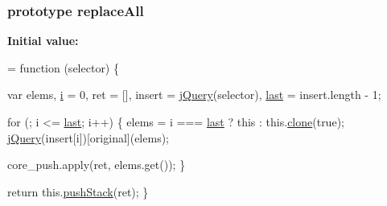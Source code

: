 \subsubsection[{\texorpdfstring{replace\+All}{replaceAll}}]{ {\bf prototype} replace\+All}\hypertarget{jquery-2_82_81-vsdoc_8js_a2e887b3101a3bb067b3acfd8d292ceb0}{}\label{jquery-2_82_81-vsdoc_8js_a2e887b3101a3bb067b3acfd8d292ceb0}
{\bfseries Initial value\+:}
\begin{DoxyCode}
= \textcolor{keyword}{function} (selector) \{
        

        var elems,
            \hyperlink{geolocation-marker_8js_a0325b7ce0988782a8032e720ef3aa411}{i} = 0,
            ret = [],
            insert = \hyperlink{jquery-2_82_81-vsdoc_8js_add5237586d970a38a81f990e8eb28c6c}{jQuery}(selector),
            \hyperlink{jquery-2_82_81-vsdoc_8js_a5a9684d230de11a6ec3029bcce128977}{last} = insert.length - 1;

        \textcolor{keywordflow}{for} (; i <= \hyperlink{jquery-2_82_81-vsdoc_8js_a5a9684d230de11a6ec3029bcce128977}{last}; i++) \{
            elems = i === \hyperlink{jquery-2_82_81-vsdoc_8js_a5a9684d230de11a6ec3029bcce128977}{last} ? \textcolor{keyword}{this} : this.\hyperlink{jquery-2_82_81-vsdoc_8js_a7d74ce76585989b4b6e2d506577e13ad}{clone}(\textcolor{keyword}{true});
            \hyperlink{jquery-2_82_81-vsdoc_8js_add5237586d970a38a81f990e8eb28c6c}{jQuery}(insert[i])[original](elems);

            
            core\_push.apply(ret, elems.get());
        \}

        \textcolor{keywordflow}{return} this.\hyperlink{jquery-2_82_81-vsdoc_8js_afc3a7db1ef2b526338c06c07cecccd44}{pushStack}(ret);
    \}
\end{DoxyCode}
